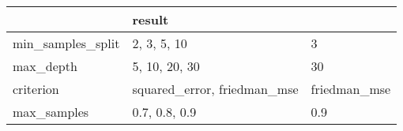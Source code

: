 \begin{tabular}{lll}
\toprule
{} &        result \\
\midrule
min\_samples\_split &                  2, 3, 5, 10 &             3 \\
max\_depth         &                5, 10, 20, 30 &            30 \\
criterion         &  squared\_error, friedman\_mse &  friedman\_mse \\
max\_samples       &                0.7, 0.8, 0.9 &           0.9 \\
\bottomrule
\end{tabular}
